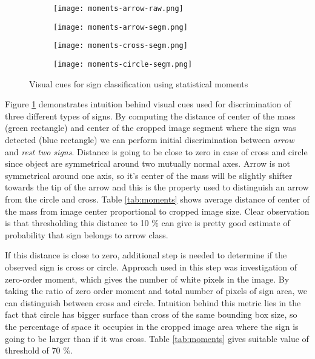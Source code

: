 \begin{figure}[th!]
	\centering
	\begin{subfigure}[b]{0.25\textwidth}
		\centering
		\texttt{[image: moments-arrow-raw.png]}
	\end{subfigure}
	\begin{subfigure}[b]{0.25\textwidth}
		\centering
		\texttt{[image: moments-arrow-segm.png]}
	\end{subfigure}
	\begin{subfigure}[b]{0.2\textwidth}
		\centering
		\texttt{[image: moments-cross-segm.png]}
	\end{subfigure}
	\begin{subfigure}[b]{0.2\textwidth}
		\centering
		\texttt{[image: moments-circle-segm.png]}
	\end{subfigure}
	\caption{Visual cues for sign classification using statistical moments}
	\label{fig:statistical-moments}
\end{figure}

Figure \ref{fig:statistical-moments} demonstrates intuition behind visual cues used for discrimination of three different types of signs. By computing the distance of center of the mass (green rectangle) and center of the cropped image segment where the sign was detected (blue rectangle) we can perform initial discrimination between \textit{arrow} and \textit{rest two signs}. Distance is going to be close to zero in case of cross and circle since object are symmetrical around two mutually normal axes. Arrow is not symmetrical around one axis, so it's center of the mass will be slightly shifter towards the tip of the arrow and this is the property used to distinguish an arrow from the circle and cross.
Table \ref{tab:moments} shows average distance of center of the mass from image center proportional to cropped image size. Clear observation is that thresholding this distance to 10 $\%$ can give is pretty good estimate of probability that sign belongs to arrow class.

If this distance is close to zero, additional step is needed to determine if the observed sign is cross or circle. Approach used in this step was investigation of zero-order moment, which gives the number of white pixels in the image. By taking the ratio of zero order moment and total number of pixels of sign area, we can distinguish between cross and circle. Intuition behind this metric lies in the fact that circle has bigger surface than cross of the same bounding box size, so the percentage of space it occupies in the cropped image area where the sign is going to be larger than if it was cross. Table \ref{tab:moments} gives suitable value of threshold of 70 $\%$.

